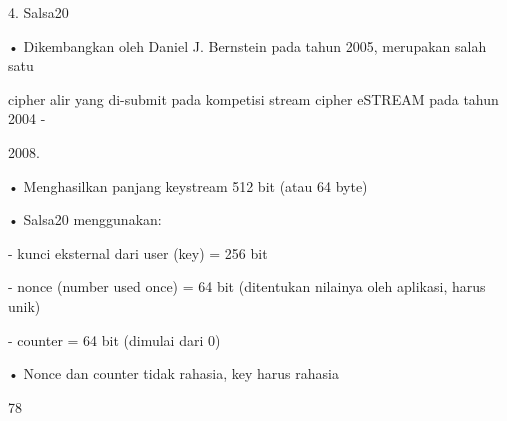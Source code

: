 \documentclass{article}
\begin{document}

4. Salsa20

• Dikembangkan oleh Daniel J. Bernstein pada tahun 2005, merupakan salah satu 

cipher alir yang di-submit pada kompetisi stream cipher eSTREAM pada tahun 2004  - 

2008.

• Menghasilkan panjang keystream 512 bit (atau 64 byte)

• Salsa20 menggunakan:

     - kunci eksternal dari user (key) = 256 bit 

     - nonce (number used once) = 64 bit    (ditentukan nilainya oleh aplikasi, harus unik)

     - counter = 64 bit  (dimulai dari 0)

• Nonce dan counter tidak rahasia, key harus rahasia

78
\end{document}
